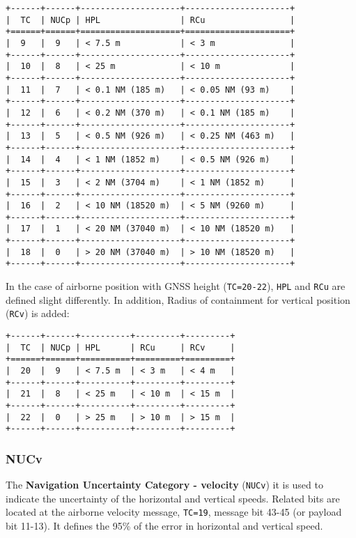 \begin{verbatim}
+------+------+--------------------+---------------------+
|  TC  | NUCp | HPL                | RCu                 |
+======+======+====================+=====================+
|  9   |  9   | < 7.5 m            | < 3 m               |
+------+------+--------------------+---------------------+
|  10  |  8   | < 25 m             | < 10 m              |
+------+------+--------------------+---------------------+
|  11  |  7   | < 0.1 NM (185 m)   | < 0.05 NM (93 m)    |
+------+------+--------------------+---------------------+
|  12  |  6   | < 0.2 NM (370 m)   | < 0.1 NM (185 m)    |
+------+------+--------------------+---------------------+
|  13  |  5   | < 0.5 NM (926 m)   | < 0.25 NM (463 m)   |
+------+------+--------------------+---------------------+
|  14  |  4   | < 1 NM (1852 m)    | < 0.5 NM (926 m)    |
+------+------+--------------------+---------------------+
|  15  |  3   | < 2 NM (3704 m)    | < 1 NM (1852 m)     |
+------+------+--------------------+---------------------+
|  16  |  2   | < 10 NM (18520 m)  | < 5 NM (9260 m)     |
+------+------+--------------------+---------------------+
|  17  |  1   | < 20 NM (37040 m)  | < 10 NM (18520 m)   |
+------+------+--------------------+---------------------+
|  18  |  0   | > 20 NM (37040 m)  | > 10 NM (18520 m)   |
+------+------+--------------------+---------------------+
\end{verbatim}

In the case of airborne position with GNSS height (\texttt{TC=20-22}),
\texttt{HPL} and \texttt{RCu} are defined slight differently. In
addition, Radius of containment for vertical position (\texttt{RCv}) is
added:

\begin{verbatim}
+------+------+----------+---------+---------+
|  TC  | NUCp | HPL      | RCu     | RCv     |
+======+======+==========+=========+=========+
|  20  |  9   | < 7.5 m  | < 3 m   | < 4 m   |
+------+------+----------+---------+---------+
|  21  |  8   | < 25 m   | < 10 m  | < 15 m  |
+------+------+----------+---------+---------+
|  22  |  0   | > 25 m   | > 10 m  | > 15 m  |
+------+------+----------+---------+---------+
\end{verbatim}

\subsubsection{NUCv}\label{nucv}

The \textbf{Navigation Uncertainty Category - velocity} (\texttt{NUCv})
it is used to indicate the uncertainty of the horizontal and vertical
speeds. Related bits are located at the airborne velocity message,
\texttt{TC=19}, message bit 43-45 (or payload bit 11-13). It defines the
95\% of the error in horizontal and vertical speed.


